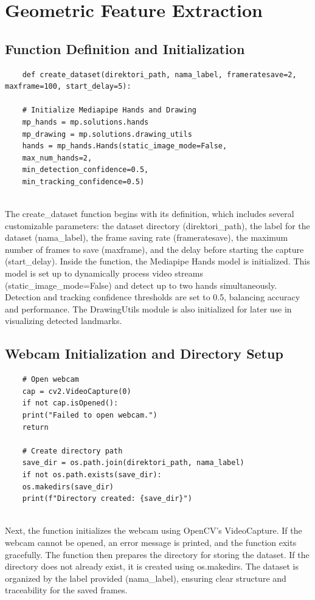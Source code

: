 \section{Geometric Feature Extraction}

\subsection{Function Definition and Initialization}
\begin{lstlisting}
	def create_dataset(direktori_path, nama_label, frameratesave=2, maxframe=100, start_delay=5):
	
	# Initialize Mediapipe Hands and Drawing
	mp_hands = mp.solutions.hands
	mp_drawing = mp.solutions.drawing_utils
	hands = mp_hands.Hands(static_image_mode=False,
	max_num_hands=2,
	min_detection_confidence=0.5,
	min_tracking_confidence=0.5)
	
\end{lstlisting}
The create\_dataset function begins with its definition, which includes several customizable parameters: the dataset directory (direktori\_path), the label for the dataset (nama\_label), the frame saving rate (frameratesave), the maximum number of frames to save (maxframe), and the delay before starting the capture (start\_delay). Inside the function, the Mediapipe Hands model is initialized. This model is set up to dynamically process video streams (static\_image\_mode=False) and detect up to two hands simultaneously. Detection and tracking confidence thresholds are set to 0.5, balancing accuracy and performance. The DrawingUtils module is also initialized for later use in visualizing detected landmarks.
\subsection{Webcam Initialization and Directory Setup}
\begin{lstlisting}
	# Open webcam
	cap = cv2.VideoCapture(0)
	if not cap.isOpened():
	print("Failed to open webcam.")
	return
	
	# Create directory path
	save_dir = os.path.join(direktori_path, nama_label)
	if not os.path.exists(save_dir):
	os.makedirs(save_dir)
	print(f"Directory created: {save_dir}")
	
\end{lstlisting}
Next, the function initializes the webcam using OpenCV’s VideoCapture. If the webcam cannot be opened, an error message is printed, and the function exits gracefully. The function then prepares the directory for storing the dataset. If the directory does not already exist, it is created using os.makedirs. The dataset is organized by the label provided (nama\_label), ensuring clear structure and traceability for the saved frames.

